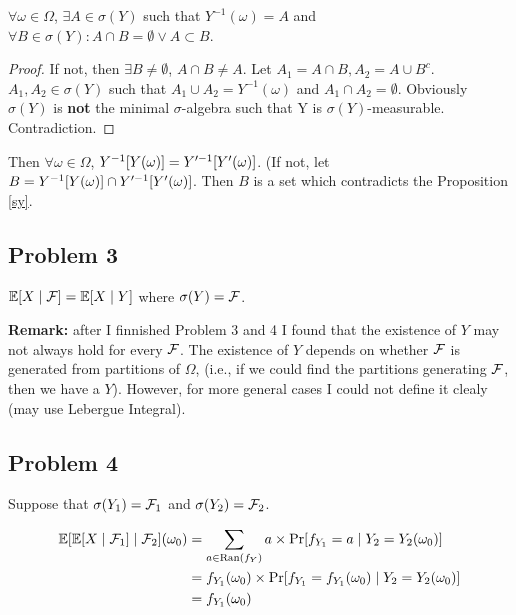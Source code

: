\documentclass{article}
\begin{document}
\begin{prp}
	\label{sy}
	$\forall\omega\in\Omega$, $\exists A\in\sigma(Y)$ such that $Y^{-1}(\omega)=A$ and $\forall B\in\sigma(Y):A\cap B=\emptyset \lor A\subset B$.
\end{prp}
\begin{proof}
	If not, then $\exists B\ne\emptyset$, $A\cap B\ne A$. Let $A_1=A\cap B,A_2=A\cup B^c$. $A_1,A_2\in\sigma(Y)$ such that $A_1\cup A_2=Y^{-1}(\omega)$ and $A_1\cap A_2=\emptyset$. Obviously $\sigma(Y)$ is \textbf{not} the minimal $\sigma$-algebra such that Y is $\sigma(Y)$-measurable. Contradiction.
\end{proof}

Then $\forall \omega\in\Omega$, $Y^{-1}\qty[Y(\omega)]=Y'^{-1}\qty[Y'(\omega)]$. (If not, let  $B=Y^{-1}\qty[Y(\omega)]\cap Y'^{-1}\qty[Y'(\omega)]$. Then $B$ is a set which contradicts the Proposition \ref{sy}.


\subsection*{\centering Problem 3}

$\mathbb{E}[X\mid\mathcal{F}]=\mathbb{E}[X\mid Y]$ where $\sigma(Y)=\mathcal{F}$.

\textbf{Remark:} after I finnished Problem 3 and 4 I found that the existence of $Y$ may not always hold for every $\mathcal{F}$. The existence of $Y$ depends on whether  $\mathcal{F}$ is generated from partitions of $\Omega$, (i.e., if we could find the partitions generating $\mathcal{F}$, then we have a  $Y$). However, for more general cases I could not define it clealy (may use Lebergue Integral).
\subsection*{\centering Problem 4}

Suppose that  $\sigma(Y_1)=\mathcal{F}_1$ and $\sigma(Y_2)=\mathcal{F}_2$.

\begin{equation}
	\begin{aligned}
		\mathbb{E}[\mathbb{E}[ X\mid\mathcal{F}_1]\mid\mathcal{F}_2](\omega_0)
		&=\sum_{a\in\text{Ran}(f_Y)}a\times\Pr[f_{Y_1}=a\mid Y_2=Y_2(\omega_0)]
		\\&=
		f_{Y_1}(\omega_0)\times\Pr[f_{Y_1}=f_{Y_1}(\omega_0)\mid Y_2=Y_2(\omega_0)]
		\\&=
		f_{Y_1}(\omega_0)
	\end{aligned}
	\label{e_1}
\end{equation}
\end{document}
